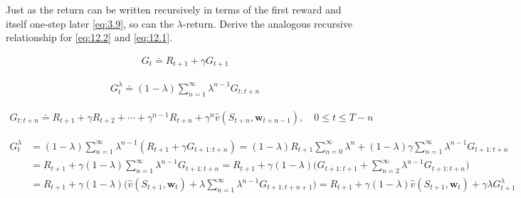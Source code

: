 
\begin{exercise}

Just as the return can be written recursively in terms of the first reward and itself one-step later \eqref{eq:3.9}, so can the $\lambda$-return.
Derive the analogous recursive relationship for \eqref{eq:12.2} and \eqref{eq:12.1}.

\begin{align} \label{eq:3.9} \tag{3.9}
    G_t
    \doteq
    R_{t+1} + \gamma G_{t+1}
\end{align}

\begin{align} \label{eq:12.2} \tag{12.2}
    G_t^\lambda
    \doteq
    (1 - \lambda)
    \sum_{n=1}^\infty
        \lambda^{n-1}
        G_{t:t+n}
\end{align}

\begin{align} \label{eq:12.1} \tag{12.1}
    G_{t:t+n}
    \doteq
    R_{t+1} + \gamma R_{t+2} + \cdots + \gamma^{n-1} R_{t+n} + \gamma^n \hat v(S_{t+n}, \mathbf w_{t+n-1}),
    \quad
    0 \leq t \leq T - n
\end{align}
\end{exercise}


\begin{solution}

\begin{align*}
  G_t^\lambda
  &=
  (1-\lambda) \sum_{n=1}^\infty \lambda^{n-1}(R_{t+1} + \gamma G_{t+1:t+n})
  =
  (1-\lambda) R_{t+1} \sum_{n=0}^\infty \lambda^{n} + (1-\lambda)\gamma  \sum_{n=1}^\infty \lambda^{n-1}G_{t+1:t+n} \\
  &=
  R_{t+1} + \gamma (1-\lambda) \sum_{n=1}^\infty \lambda^{n-1}G_{t+1:t+n}
  =
  R_{t+1} + \gamma (1-\lambda)\Big(G_{t+1:t+1} + \sum_{n=2}^\infty \lambda^{n-1}G_{t+1:t+n}\Big) \\
  &=
  R_{t+1} + \gamma (1-\lambda)\Big(\hat{v}(S_{t+1},\textbf{w}_t) + \lambda \sum_{n=1}^\infty \lambda^{n-1}G_{t+1:t+n+1}\Big)
  =
  R_{t+1} + \gamma (1-\lambda)\hat{v}(S_{t+1},\textbf{w}_t) + \gamma\lambda G_{t+1}^\lambda
\end{align*}

\end{solution}

